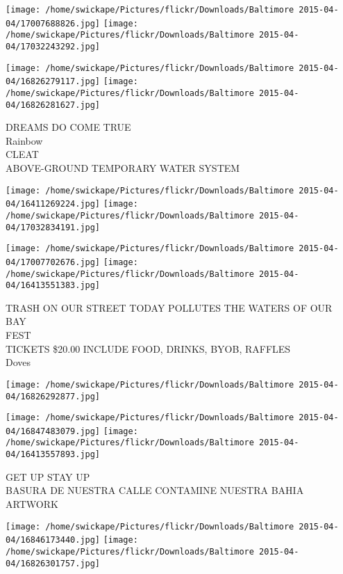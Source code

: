 \documentclass[10pt,letterpaper]{article}
\begin{document}
\texttt{[image: /home/swickape/Pictures/flickr/Downloads/Baltimore 2015-04-04/17007688826.jpg]}
\texttt{[image: /home/swickape/Pictures/flickr/Downloads/Baltimore 2015-04-04/17032243292.jpg]}

\texttt{[image: /home/swickape/Pictures/flickr/Downloads/Baltimore 2015-04-04/16826279117.jpg]}
\texttt{[image: /home/swickape/Pictures/flickr/Downloads/Baltimore 2015-04-04/16826281627.jpg]}

DREAMS DO COME TRUE\\
Rainbow\\
CLEAT\\
ABOVE{-}GROUND TEMPORARY WATER SYSTEM\\
\pagebreak

\texttt{[image: /home/swickape/Pictures/flickr/Downloads/Baltimore 2015-04-04/16411269224.jpg]}
\texttt{[image: /home/swickape/Pictures/flickr/Downloads/Baltimore 2015-04-04/17032834191.jpg]}

\texttt{[image: /home/swickape/Pictures/flickr/Downloads/Baltimore 2015-04-04/17007702676.jpg]}
\texttt{[image: /home/swickape/Pictures/flickr/Downloads/Baltimore 2015-04-04/16413551383.jpg]}

TRASH ON OUR STREET TODAY POLLUTES THE WATERS OF OUR BAY\\
FEST\\
TICKETS \$20.00 INCLUDE FOOD, DRINKS, BYOB, RAFFLES\\
Doves\\
\pagebreak

\texttt{[image: /home/swickape/Pictures/flickr/Downloads/Baltimore 2015-04-04/16826292877.jpg]}

\vspace{0.25in}
\texttt{[image: /home/swickape/Pictures/flickr/Downloads/Baltimore 2015-04-04/16847483079.jpg]}
\texttt{[image: /home/swickape/Pictures/flickr/Downloads/Baltimore 2015-04-04/16413557893.jpg]}

GET UP STAY UP\\
BASURA DE NUESTRA CALLE CONTAMINE NUESTRA BAHIA\\
ARTWORK\\
\pagebreak

\texttt{[image: /home/swickape/Pictures/flickr/Downloads/Baltimore 2015-04-04/16846173440.jpg]}
\texttt{[image: /home/swickape/Pictures/flickr/Downloads/Baltimore 2015-04-04/16826301757.jpg]}
\end{document}

